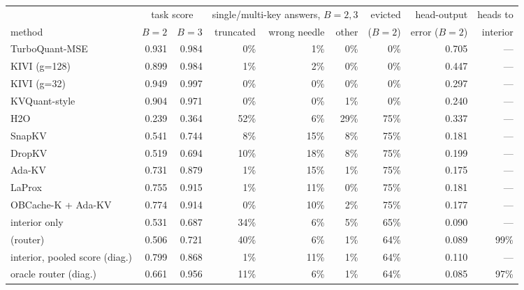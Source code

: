 \begin{tabular}{@{}lrrrrrrrr@{}}
\toprule
 & \multicolumn{2}{c}{task score} & \multicolumn{3}{c}{single/multi-key answers, $B{=}2,3$} & evicted & head-output & heads to \\
\cmidrule(lr){2-3}\cmidrule(lr){4-6}
method & $B{=}2$ & $B{=}3$ & truncated & wrong needle & other & ($B{=}2$) & error ($B{=}2$) & interior \\
\midrule
TurboQuant-MSE & 0.931 & 0.984 & 0\% & 1\% & 0\% & 0\% & 0.705 & --- \\
KIVI (g=128) & 0.899 & 0.984 & 1\% & 2\% & 0\% & 0\% & 0.447 & --- \\
KIVI (g=32) & 0.949 & 0.997 & 0\% & 0\% & 0\% & 0\% & 0.297 & --- \\
KVQuant-style & 0.904 & 0.971 & 0\% & 0\% & 1\% & 0\% & 0.240 & --- \\
H2O & 0.239 & 0.364 & 52\% & 6\% & 29\% & 75\% & 0.337 & --- \\
SnapKV & 0.541 & 0.744 & 8\% & 15\% & 8\% & 75\% & 0.181 & --- \\
DropKV & 0.519 & 0.694 & 10\% & 18\% & 8\% & 75\% & 0.199 & --- \\
Ada-KV & 0.731 & 0.879 & 1\% & 15\% & 1\% & 75\% & 0.175 & --- \\
LaProx & 0.755 & 0.915 & 1\% & 11\% & 0\% & 75\% & 0.181 & --- \\
OBCache-K + Ada-KV & 0.774 & 0.914 & 0\% & 10\% & 2\% & 75\% & 0.177 & --- \\
\sieve{} interior only & 0.531 & 0.687 & 34\% & 6\% & 5\% & 65\% & 0.090 & --- \\
\sieve{} (router) & 0.506 & 0.721 & 40\% & 6\% & 1\% & 64\% & 0.089 & 99\% \\
\sieve{} interior, pooled score (diag.) & 0.799 & 0.868 & 1\% & 11\% & 1\% & 64\% & 0.110 & --- \\
\sieve{} oracle router (diag.) & 0.661 & 0.956 & 11\% & 6\% & 1\% & 64\% & 0.085 & 97\% \\
\bottomrule
\end{tabular}
